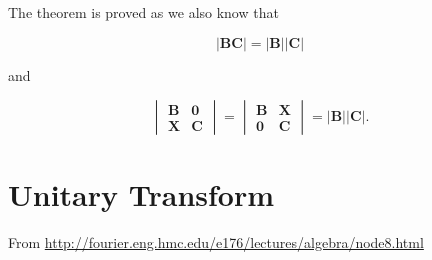 \documentclass[10pt,b5paper,titlepage]{book}
\begin{document}
\begin{itemize}
        The theorem is proved as we also know that

        \begin{equation}
            |\mathbf{B} \mathbf{C}| = |\mathbf{B}| |\mathbf{C}|
        \end{equation}

        and

        \begin{equation}
            \begin{vmatrix}
                \mathbf{B} & \mathbf{0}\\
                \mathbf{X} & \mathbf{C}
            \end{vmatrix} = \begin{vmatrix}
                \mathbf{B} & \mathbf{X}\\
                \mathbf{0} & \mathbf{C}
            \end{vmatrix} = |\mathbf{B}| |\mathbf{C}|
        .\end{equation}
\end{itemize}




\chapter{Unitary Transform}
From \url{http://fourier.eng.hmc.edu/e176/lectures/algebra/node8.html}
\end{document}
